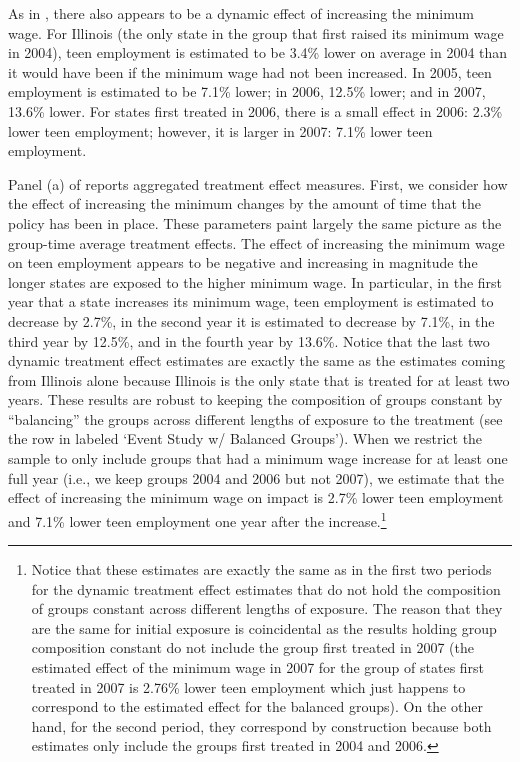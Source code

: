 \documentclass[11pt]{article}%
\theoremstyle{plain}
\numberwithin{sassumption}{section}
\numberwithin{equation}{section}
\begin{document}


As in \cite{Meer2016}, there also appears to be a dynamic effect of increasing
the minimum wage. For Illinois (the only state in the group that first raised
its minimum wage in 2004), teen employment is estimated to be 3.4\% lower on average in 2004
than it would have been if the minimum wage had not been increased. In 2005,
teen employment is estimated to be 7.1\% lower; in 2006, 12.5\% lower; and in
2007, 13.6\% lower. For states first treated in 2006, there is a small effect
in 2006: 2.3\% lower teen employment; however, it is larger in 2007: 7.1\%
lower teen employment.

Panel (a) of  reports aggregated treatment effect measures.
First, we consider how the effect of increasing the minimum changes by the
amount of time that the policy has been in place. These parameters paint
largely the same picture as the group-time average treatment effects. The
effect of increasing the minimum wage on teen employment appears to be
negative and increasing in magnitude the longer states are exposed to the
higher minimum wage. In particular, in the first year that a state increases
its minimum wage, teen employment is estimated to decrease by 2.7\%, in the
second year it is estimated to decrease by 7.1\%, in the third year by 12.5\%,
and in the fourth year by 13.6\%. Notice that the last two dynamic treatment
effect estimates are exactly the same as the estimates coming from Illinois
alone because Illinois is the only state that is treated for at least two
years. These results are robust to keeping the composition of groups constant
by ``balancing'' the groups across different lengths of exposure to the 
treatment (see the row in  labeled `Event Study w/ Balanced
Groups'). When we restrict the sample to only include groups that had a
minimum wage increase for at least one full year (i.e., we keep groups 2004
and 2006 but not 2007), we estimate that the effect of increasing the minimum
wage on impact is 2.7\% lower teen employment and 7.1\% lower teen employment
one year after the increase.\footnote{Notice that these estimates are exactly
the same as in the first two periods for the dynamic treatment effect
estimates that do not hold the composition of groups constant across different
lengths of exposure. The reason that they are the same for initial exposure is
coincidental as the results holding group composition constant do not include
the group first treated in 2007 (the estimated effect of the minimum wage in
2007 for the group of states first treated in 2007 is 2.76\% lower teen
employment which just happens to correspond to the estimated effect for the balanced groups). On the other hand, for the second period, they correspond by
construction because both estimates only include the groups first treated in
2004 and 2006.}
\end{document}
